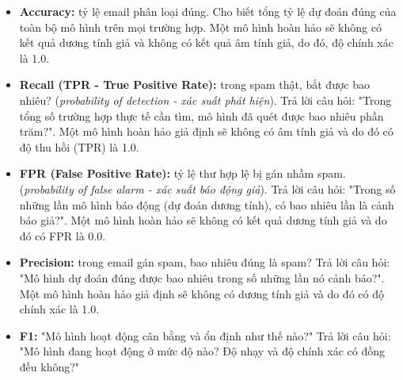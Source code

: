 \documentclass[12pt,a4paper]{article}
\begin{document}
\begin{ynghia}[title={Diễn giải (ví dụ spam)}]
\begin{itemize}
  \item \textbf{Accuracy:} tỷ lệ email phân loại đúng. Cho biết tổng tỷ lệ dự đoán đúng của toàn bộ mô hình trên mọi trường hợp. Một mô hình hoàn hảo sẽ không có kết quả dương tính giả và không có kết quả âm tính giả, do đó, độ chính xác là 1.0.
  \item \textbf{Recall (TPR - True Positive Rate):} trong spam thật, bắt được bao nhiêu? (\emph{probability of detection - xác suất phát hiện}). Trả lời câu hỏi: "Trong tổng số trường hợp thực tế cần tìm, mô hình đã quét được bao nhiêu phần trăm?". Một mô hình hoàn hảo giả định sẽ không có âm tính giả và do đó có độ thu hồi (TPR) là 1.0.
  \item \textbf{FPR (False Positive Rate):} tỷ lệ thư hợp lệ bị gán nhầm spam. (\emph{probability of false alarm - xác suất báo động giả}). Trả lời câu hỏi: "Trong số những lần mô hình báo động (dự đoán dương tính), có bao nhiêu lần là cảnh báo giả?". Một mô hình hoàn hảo sẽ không có kết quả dương tính giả và do đó có FPR là 0.0.
  \item \textbf{Precision:} trong email gán spam, bao nhiêu đúng là spam? Trả lời câu hỏi: "Mô hình dự đoán đúng được bao nhiêu trong số những lần nó cảnh báo?". Một mô hình hoàn hảo giả định sẽ không có dương tính giả và do đó có độ chính xác là 1.0.
  \item \textbf{F1:} "Mô hình hoạt động cân bằng và ổn định như thế nào?" Trả lời câu hỏi: "Mô hình đang hoạt động ở mức độ nào? Độ nhạy và độ chính xác có đồng đều không?"
\end{itemize}
\end{ynghia}
\end{document}
